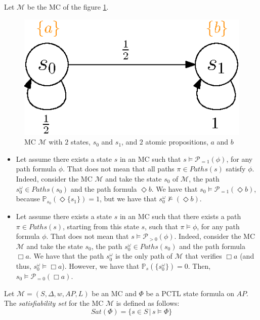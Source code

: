 \begin{remark}
Let $\mathcal{M}$ be the MC of the figure \ref{pctlctl}.
\begin{figure}[h]
  \centering
  \includegraphics[width=0.25\linewidth]{resources/PCTL_CTL}
  \captionsetup{justification=centering}
  \caption{MC $\mathcal{M}$ with $2$ states, $s_0$ and $s_1$, and $2$ atomic propositions, $a$ and $b$}\label{pctlctl}
\end{figure}
\begin{itemize}
  \item Let assume there exists a state $s$ in an MC such that $s \models \mathcal{P}_{=1}(\phi)$, for any path formula $\phi$. That does not mean that all paths $\pi \in Paths(s)$ satisfy $\phi$.
  Indeed, consider the MC $\mathcal{M}$ and take the state $s_0$ of $\mathcal{M}$, the path $s_0^\omega \in Paths(s_0)$ and the path formula $\Diamond b$. We have that $s_0 \models \mathcal{P}_{=1}(\Diamond b)$, because $\mathbb{P}_{s_0}(\Diamond \{s_1\})=1$, but we have that $s_0^\omega \not \models (\Diamond b)$.

  \item Let assume there exists a state $s$ in an MC such that there exists a path $\pi \in Paths(s)$, starting from this state $s$, such that $\pi \models \phi$, for any path formula $\phi$.
  That does not mean that $s \models \mathcal{P}_{> 0}(\phi)$.
  Indeed, consider the MC $\mathcal{M}$ and take the state $s_0$, the path $s_0^\omega \in Paths(s_0)$ and the path formula $\Box a$. We have that the path $s_0^\omega$ is the only path of $\mathcal{M}$ that verifies $\Box a$ (and thus, $s_0^\omega \models \Box a$).
  However, we have that $\mathbb{P}_s(\{s_0^\omega\})=0$. Then, $s_0 \models \mathcal{P}_{=0} (\Box a)$.
\end{itemize}
\end{remark}

\begin{definition}
  Let $\mathcal{M}=(S, \Delta, w, AP, L)$ be an MC and $\Phi$ be a PCTL state formula on $AP$. The \textit{satisfiability set} for the MC $\mathcal{M}$ is defined as follows:
  \[
    Sat(\Phi) = \{ s \in S \, | \, s \models \Phi \}
  \]
\end{definition}
